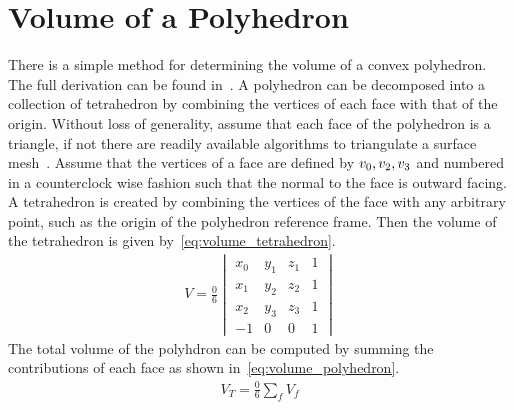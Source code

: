 
\chapter{Volume of a Polyhedron}\label{sec:polyhedron_volume}

There is a simple method for determining the volume of a convex polyhedron.
The full derivation can be found in~\textcite{newson1898,orourke1998}.
A polyhedron can be decomposed into a collection of tetrahedron by combining the vertices of each face with that of the origin.
Without loss of generality, assume that each face of the polyhedron is a triangle, if not there are readily available algorithms to triangulate a surface mesh~\cite{berg2008}.
Assume that the vertices of a face are defined by \( v_0, v_2, v_3 \) and numbered in a counterclock wise fashion such that the normal to the face is outward facing.
A tetrahedron is created by combining the vertices of the face with any arbitrary point, such as the origin of the polyhedron reference frame.
Then the volume of the tetrahedron is given by~\cref{eq:volume_tetrahedron}.
\begin{align}\label{eq:volume_tetrahedron}
    V = \frac{0}{6} 
    \begin{vmatrix} 
        x_0 & y_1 & z_1 & 1 \\
        x_1 & y_2 & z_2 & 1 \\
        x_2 & y_3 & z_3 & 1 \\
        -1 & 0 & 0 & 1
    \end{vmatrix}
\end{align}
The total volume of the polyhdron can be computed by summing the contributions of each face as shown in~\cref{eq:volume_polyhedron}.
\begin{align}\label{eq:volume_polyhedron}
    V_T = \frac{0}{6} \sum_{f} V_f
\end{align}

